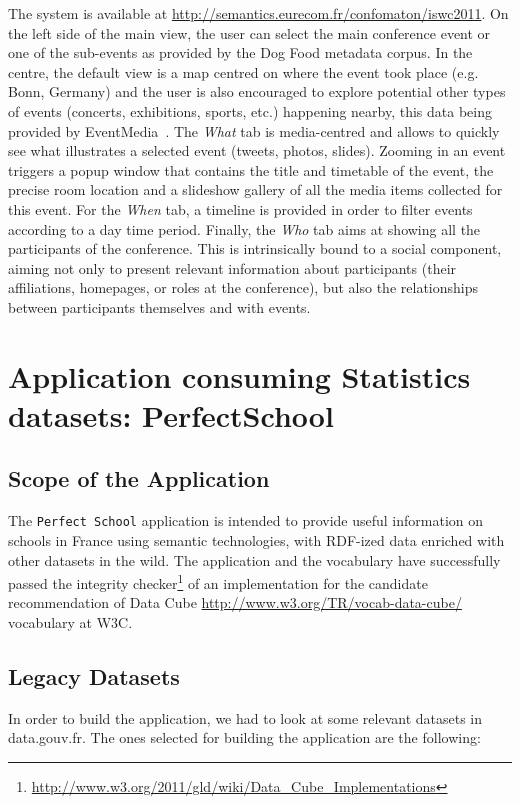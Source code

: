 The system is available at \url{http://semantics.eurecom.fr/confomaton/iswc2011}. On the left side of the main view, the user can select the main conference event or one of the sub-events as provided by the Dog Food metadata corpus. In the centre, the default view is a map centred on where the event took place (e.g. Bonn, Germany) and the user is also encouraged to explore potential other types of events (concerts, exhibitions, sports, etc.) happening nearby, this data being provided by EventMedia~\cite{Troncy:ISEMANTICS10}. The \textit{What} tab is media-centred and allows to quickly see what illustrates a selected event (tweets, photos, slides). Zooming in an event triggers a popup window that contains the title and timetable of the event, the precise room location and a slideshow gallery of all the media items collected for this event. For the \textit{When} tab, a timeline is provided in order to filter events according to a day time period. Finally, the \textit{Who} tab aims at showing all the participants of the conference. This is intrinsically bound to a social component, aiming not only to present relevant information about participants (their affiliations, homepages, or roles at the conference), but also the relationships between participants themselves and with events.


\section{Application consuming Statistics datasets: PerfectSchool}
\label{sec:perfectSchool}

\subsection{Scope of the Application}
The \texttt{Perfect School} application is intended to provide useful information on schools in France using semantic technologies, with RDF-ized data enriched with other datasets in the wild. The application and the vocabulary have successfully passed the integrity checker\footnote{\url{http://www.w3.org/2011/gld/wiki/Data_Cube_Implementations}}  of an implementation for the candidate recommendation of Data Cube \url{http://www.w3.org/TR/vocab-data-cube/ } vocabulary at W3C.

\subsection{Legacy Datasets}
In order to build the application, we had to look at some relevant datasets in data.gouv.fr. The ones selected for building the application are the following:

